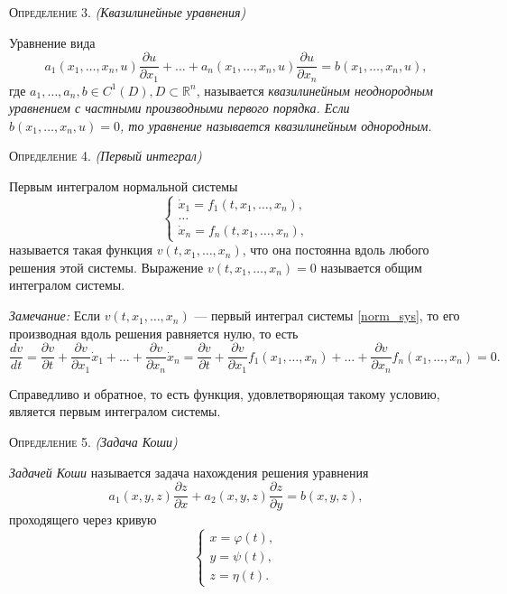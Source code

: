 \textsc{Определение 3.} \textit{(Квазилинейные уравнения)}

Уравнение вида 
\begin{equation}
	a_1(x_1, \dotsc, x_n, u) \frac{\partial u}{\partial x_1} + \dotsc + a_n(x_1, \dotsc, x_n, u) \frac{\partial u}{\partial x_n} = b(x_1, \dotsc, x_n, u),
\end{equation}
где $ a_1, \dotsc, a_n, b \in C^1(D), D \subset \mathbb{R}^{n}$, называется \textit{квазилинейным неоднородным уравнением с частными производными первого порядка. Если $ b(x_1, \dotsc, x_n, u) = 0$, то уравнение называется квазилинейным однородным.} 

\textsc{Определение 4.} \textit{(Первый интеграл)}

Первым интегралом нормальной системы
\begin{equation} \label{norm_sys}
	\begin{cases}
		\dot{x}_1 = f_1(t, x_1, \dotsc, x_n), \\
		\dotsc \\
		\dot{x}_n = f_n(t, x_1, \dotsc, x_n),
	\end{cases}
\end{equation} 
называется такая функция $ v(t, x_1, \dotsc, x_n)$, что она постоянна вдоль любого решения этой системы. Выражение $ v(t, x_1, \dotsc, x_n) = 0$ называется общим интегралом системы. 

\textit{Замечание:} Если $ v(t, x_1, \dotsc, x_n) $ --- первый интеграл системы \eqref{norm_sys}, то его производная вдоль решения равняется нулю, то есть 
\begin{equation*}
	\frac{d v}{d t} = \frac{\partial v}{\partial t} + \frac{\partial v}{\partial x_1} \dot{x}_1 + \dotsc + \frac{\partial v}{\partial x_n} \dot{x}_n = \frac{\partial v}{\partial t} + \frac{\partial v}{\partial x_1} f_1(x_1, \dotsc, x_n) + \dotsc + \frac{\partial v}{\partial x_n} f_n(x_1, \dotsc, x_n) = 0.
\end{equation*}

Справедливо и обратное, то есть функция, удовлетворяющая такому условию, является первым интегралом системы.

\textsc{Определение 5.} \textit{(Задача Коши)}

\textit{Задачей Коши} называется задача нахождения решения уравнения 
\begin{equation*}
	a_1(x, y, z) \frac{\partial z}{\partial x} + a_2(x, y, z) \frac{\partial z}{\partial y} = b(x, y, z),
\end{equation*}
проходящего через кривую
\begin{equation*}
	\begin{cases}
		x = \varphi(t), \\
		y = \psi(t), \\
		z = \eta(t).
	\end{cases}
\end{equation*}

